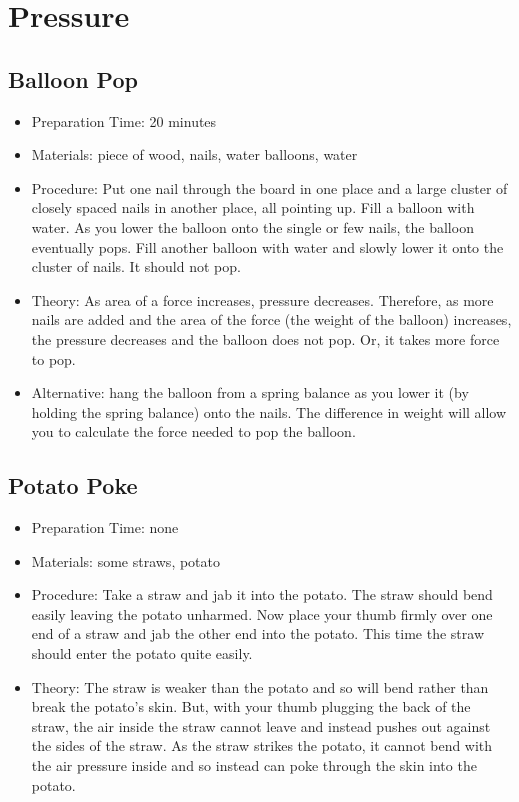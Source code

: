 \section{Pressure}


\subsection{Balloon Pop}
\begin{itemize}
\item{Preparation Time: 20 minutes}
\item{Materials: piece of wood, nails, water balloons, water}
\item{Procedure: Put one nail through the board in one place and a large cluster of closely spaced nails in another place, all pointing up. Fill a balloon with water. As you lower the balloon onto the single or few nails, the balloon eventually pops. Fill another balloon with water and slowly lower it onto the cluster of nails. It should not pop.}
\item{Theory: As area of a force increases, pressure decreases. Therefore, as more nails are added and the area of the force (the weight of the balloon) increases, the pressure decreases and the balloon does not pop. Or, it takes more force to pop.}
\item{Alternative: hang the balloon from a spring balance as you lower it (by holding the spring balance) onto the nails. The difference in weight will allow you to calculate the force needed to pop the balloon.}
\end{itemize}

\subsection{Potato Poke}
\begin{itemize}
\item{Preparation Time: none}
\item{Materials: some straws, potato}
\item{Procedure: Take a straw and jab it into the potato. The straw should bend easily leaving the potato unharmed. Now place your thumb firmly over one end of a straw and jab the other end into the potato. This time the straw should enter the potato quite easily.}
\item{Theory: The straw is weaker than the potato and so will bend rather than break the potato’s skin. But, with your thumb plugging the back of the straw, the air inside the straw cannot leave and instead pushes out against the sides of the straw. As the straw strikes the potato, it cannot bend with the air pressure inside and so instead can poke through the skin into the potato.}
\end{itemize}



